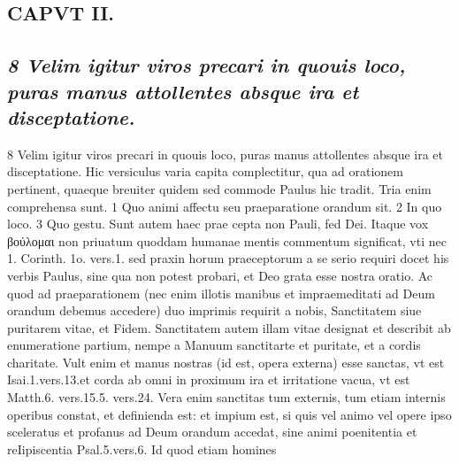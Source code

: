 \documentclass{article}
\begin{document}
\begin{pages}
\section*{CAPVT  II. }
\marginpar{[ p.65 ]}\pstart {}
{}
\subsection*{\textit{8 Velim igitur viros precari in quouis loco, puras manus attollentes absque ira et disceptatione.}}8 Velim igitur viros precari in quouis loco, puras manus attollentes absque ira et disceptatione. Hic versiculus varia capita complectitur, qua ad orationem pertinent, quaeque breuiter quidem sed commode Paulus hic tradit. Tria enim comprehensa sunt. 1 Quo animi affectu seu praeparatione orandum sit. 2 In quo loco. 3 Quo gestu. Sunt autem haec prae cepta non Pauli, fed Dei. Itaque vox βούλομαι non priuatum quoddam humanae mentis commentum significat, vti nec 1. Corinth. 1o. vers.1. sed praxin horum praeceptorum a se serio requiri docet his verbis Paulus, sine qua non potest probari, et Deo grata esse nostra oratio. Ac quod ad praeparationem (nec enim illotis manibus et impraemeditati ad Deum orandum debemus accedere) duo imprimis requirit a nobis, Sanctitatem siue puritarem vitae, et Fidem. Sanctitatem autem illam vitae designat et describit ab enumeratione partium, nempe a Manuum sanctitarte et puritate, et a cordis charitate. Vult enim et manus nostras (id est, opera externa) esse sanctas, vt est Isai.1.vers.13.et corda ab omni in proximum ira et irritatione vacua, vt est Matth.6. vers.15.5. vers.24. Vera enim sanctitas tum externis, tum etiam internis operibus constat, et definienda est: et impium est, si quis vel animo vel opere ipso sceleratus et profanus ad Deum orandum accedat, sine animi poenitentia et reIipiscentia Psal.5.vers.6. Id quod etiam homines  \pend

\end{pages}
\end{document}
